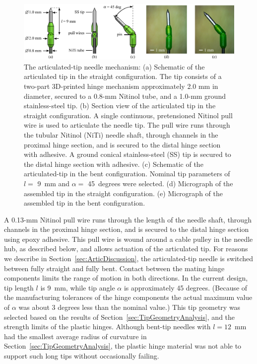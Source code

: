 \begin{figure}[!ht]
\centering
\includegraphics[width=\textwidth]{Images/Chapter3/ArticulatedTipDetail/ArticulatedTipDetail}
\caption[Articulated-tip needle mechanism]{The articulated-tip needle mechanism: (a) Schematic of the articulated tip in the straight configuration. The tip consists of a two-part 3D-printed hinge mechanism approximately 2.0 mm in diameter, secured to a 0.8-mm Nitinol tube, and a 1.0-mm ground stainless-steel tip. (b) Section view of the articulated tip in the straight configuration. A single continuous, pretensioned Nitinol pull wire is used to articulate the needle tip. The pull wire runs through the tubular Nitinol (NiTi) needle shaft, through channels in the proximal hinge section, and is secured to the distal hinge section with adhesive. A ground conical stainless-steel (SS) tip is secured to the distal hinge section with adhesive. (c) Schematic of the articulated-tip in the bent configuration. Nominal tip parameters of $l =$ 9~mm and $\alpha =$ 45~degrees were selected. (d) Micrograph of the assembled tip in the straight configuration. (e) Micrograph of the assembled tip in the bent configuration.}
\label{fig:ArticulatedTipDetail}
\end{figure} 

A 0.13-mm Nitinol pull wire runs through the length of the needle shaft, through channels in the proximal hinge section, and is secured to the distal hinge section using epoxy adhesive. This pull wire is wound around a cable pulley in the needle hub, as described below, and allows actuation of the articulated tip. For reasons we describe in Section~\ref{sec:ArticDiscussion}, the articulated-tip needle is switched between fully straight and fully bent. Contact between the mating hinge components limits the range of motion in both directions. In the current design, tip length $l$ is 9~mm, while tip angle $\alpha$ is approximately 45 degrees. (Because of the manufacturing tolerances of the hinge components the actual maximum value of $\alpha$ was about 3 degrees less than the nominal value.) This tip geometry was selected based on the results of Section~\ref{sec:TipGeometryAnalysis}, and the strength limits of the plastic hinges. Although bent-tip needles with $l = 12$~mm had the smallest average radius of curvature in Section~\ref{sec:TipGeometryAnalysis}, the plastic hinge material was not able to support such long tips without occasionally failing.

